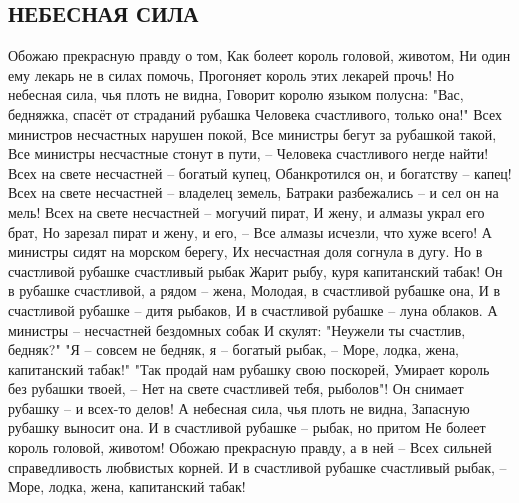  
 
 
 
 

\subsection{НЕБЕСНАЯ СИЛА}

Обожаю прекрасную правду о том,
Как болеет король головой, животом,
Ни один ему лекарь не в силах помочь,
Прогоняет король этих лекарей прочь!
Но небесная сила, чья плоть не видна,
Говорит королю языком полусна:
"Вас, бедняжка, спасёт от страданий рубашка
Человека счастливого, только она!"
Всех министров несчастных нарушен покой,
Все министры бегут за рубашкой такой,
Все министры несчастные стонут в пути, –
Человека счастливого негде найти!
Всех на свете несчастней – богатый купец,
Обанкротился он, и богатству – капец!
Всех на свете несчастней – владелец земель,
Батраки разбежались – и сел он на мель!
Всех на свете несчастней – могучий пират,
И жену, и алмазы украл его брат,
Но зарезал пират и жену, и его, –
Все алмазы исчезли, что хуже всего!
А министры сидят на морском берегу,
Их несчастная доля согнула в дугу.
Но в счастливой рубашке счастливый рыбак
Жарит рыбу, куря капитанский табак!
Он в рубашке счастливой, а рядом – жена,
Молодая, в счастливой рубашке она,
И в счастливой рубашке – дитя рыбаков,
И в счастливой рубашке – луна облаков.
А министры – несчастней бездомных собак
И скулят: "Неужели ты счастлив, бедняк?"
"Я – совсем не бедняк, я – богатый рыбак, –
Море, лодка, жена, капитанский табак!"
"Так продай нам рубашку свою поскорей,
Умирает король без рубашки твоей, –
Нет на свете счастливей тебя, рыболов"!
Он снимает рубашку – и всех-то делов!
А небесная сила, чья плоть не видна,
Запасную рубашку выносит она.
И в счастливой рубашке – рыбак, но притом
Не болеет король головой, животом!
Обожаю прекрасную правду, а в ней –
Всех сильней справедливость любвистых корней.
И в счастливой рубашке счастливый рыбак, –
Море, лодка, жена, капитанский табак!
